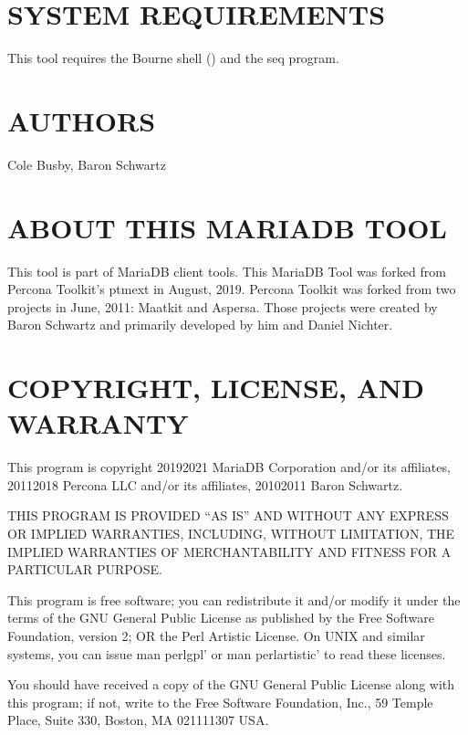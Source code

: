 \documentclass[letterpaper,10pt,english]{sphinxmanual}
\begin{document}
\section{SYSTEM REQUIREMENTS}
\label{\detokenize{mariadb-status-diff:system-requirements}}
This tool requires the Bourne shell () and the seq program.


\section{AUTHORS}
\label{\detokenize{mariadb-status-diff:authors}}
Cole Busby, Baron Schwartz


\section{ABOUT THIS MARIADB TOOL}
\label{\detokenize{mariadb-status-diff:about-this-mariadb-tool}}
This tool is part of MariaDB client tools. This MariaDB Tool was forked from
Percona Toolkit’s pt\sphinxhyphen{}mext in August, 2019. Percona Toolkit was forked from two
projects in June, 2011: Maatkit and Aspersa.  Those projects were created by
Baron Schwartz and primarily developed by him and Daniel Nichter.


\section{COPYRIGHT, LICENSE, AND WARRANTY}
\label{\detokenize{mariadb-status-diff:copyright-license-and-warranty}}
This program is copyright 2019\sphinxhyphen{}2021 MariaDB Corporation and/or its affiliates,
2011\sphinxhyphen{}2018 Percona LLC and/or its affiliates, 2010\sphinxhyphen{}2011 Baron Schwartz.

THIS PROGRAM IS PROVIDED “AS IS” AND WITHOUT ANY EXPRESS OR IMPLIED
WARRANTIES, INCLUDING, WITHOUT LIMITATION, THE IMPLIED WARRANTIES OF
MERCHANTABILITY AND FITNESS FOR A PARTICULAR PURPOSE.

This program is free software; you can redistribute it and/or modify it under
the terms of the GNU General Public License as published by the Free Software
Foundation, version 2; OR the Perl Artistic License.  On UNIX and similar
systems, you can issue \textasciigrave{}man perlgpl’ or \textasciigrave{}man perlartistic’ to read these
licenses.

You should have received a copy of the GNU General Public License along with
this program; if not, write to the Free Software Foundation, Inc., 59 Temple
Place, Suite 330, Boston, MA  02111\sphinxhyphen{}1307  USA.
\end{document}
